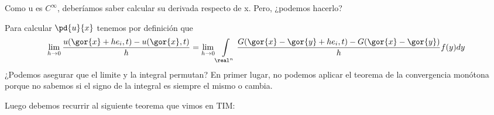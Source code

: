 






		Como u es $C^\infty$, deberíamos saber calcular su derivada respecto de x. Pero, ¿podemos hacerlo?

		Para calcular $\pd{u}{x}$ tenemos por definición que
		\[ \lim_{h \to 0} \frac{u(\gor{x} + h e_i,t)-u(\gor{x},t)}{h} = \lim_{h \to 0} \int\limits_{\real^n} \frac{G(\gor{x}-\gor{y}+he_i,t)-G(\gor{x}-\gor{y})}{h} f(y) dy \]
		¿Podemos asegurar que el limite y la integral permutan? En primer lugar, no podemos aplicar el teorema de la convergencia monótona porque no sabemos si el signo de la integral es siempre el mismo o cambia.

		Luego debemos recurrir al siguiente teorema que vimos en TIM:

